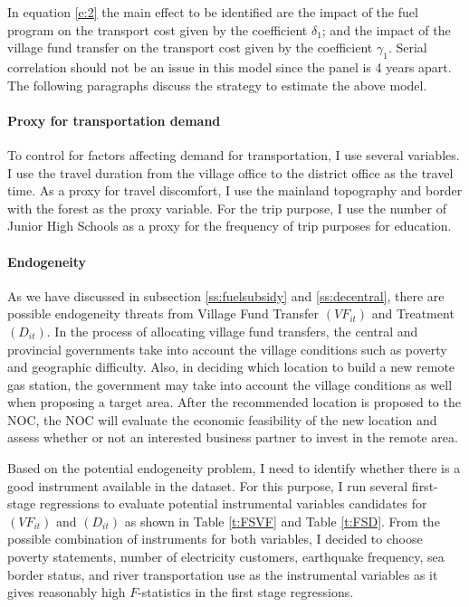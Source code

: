 \documentclass[letterpaper,12pt,leqno]{article}
\begin{document}
In equation \eqref{e:2} the main effect to be identified are the impact of the fuel program on the transport cost given by the coefficient $\delta_1$; and the impact of the village fund transfer on the transport cost given by the coefficient $\gamma_1$. Serial correlation should not be an issue in this model since the panel is 4 years apart. The following paragraphs discuss the strategy to estimate the above model.

\paragraph{Proxy for transportation demand} To control for factors affecting demand for transportation, I use several variables. I use the travel duration from the village office to the district office as the travel time. As a proxy for travel discomfort, I use the mainland topography and border with the forest as the proxy variable. For the trip purpose, I use the number of Junior High Schools as a proxy for the frequency of trip purposes for education. 

\paragraph{Endogeneity} As we have discussed in subsection \ref{ss:fuelsubsidy} and \ref{ss:decentral}, there are possible endogeneity threats from Village Fund Transfer $(VF_{it})$ and Treatment $(D_{it})$. In the process of allocating village fund transfers, the central and provincial governments take into account the village conditions such as poverty and geographic difficulty. Also, in deciding which location to build a new remote gas station, the government may take into account the village conditions as well when proposing a target area. After the recommended location is proposed to the NOC, the NOC will evaluate the economic feasibility of the new location and assess whether or not an interested business partner to invest in the remote area. 

Based on the potential endogeneity problem, I need to identify whether there is a good instrument available in the dataset. For this purpose, I run several first-stage regressions to evaluate potential instrumental variables candidates for $(VF_{it})$ and $(D_{it})$ as shown in Table \ref{t:FSVF} and Table \ref{t:FSD}. From the possible combination of instruments for both variables, I decided to choose poverty statements, number of electricity customers, earthquake frequency, sea border status, and river transportation use as the instrumental variables as it gives reasonably high $F$-statistics in the first stage regressions.
\end{document}
